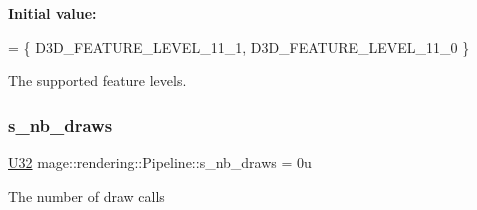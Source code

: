 {\bfseries Initial value\+:}
\begin{DoxyCode}
= \{
            D3D\_FEATURE\_LEVEL\_11\_1,
            D3D\_FEATURE\_LEVEL\_11\_0
        \}
\end{DoxyCode}
The supported feature levels. \mbox{\label{structmage_1_1rendering_1_1_pipeline_a47d649cdfea830ee048554accd2cab10}} 
\subsubsection{\texorpdfstring{s\+\_\+nb\+\_\+draws}{s\_nb\_draws}}
{\footnotesize\ttfamily \mbox{\hyperlink{namespacemage_aa5d6eaabaac3cdd01873d6a3d27e90f3}{U32}} mage\+::rendering\+::\+Pipeline\+::s\+\_\+nb\+\_\+draws = 0u\hspace{0.3cm}{\ttfamily [static]}}

The number of draw calls 
